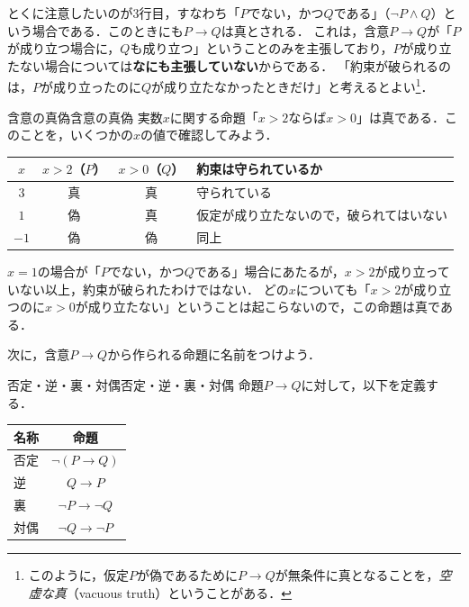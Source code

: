 とくに注意したいのが3行目，すなわち「$P$でない，かつ$Q$である」（$\lnot P \land Q$）という場合である．このときにも$P \to Q$は真とされる．
これは，含意$P \to Q$が「$P$が成り立つ場合に，$Q$も成り立つ」ということのみを主張しており，$P$が成り立たない場合については\textbf{なにも主張していない}からである．
「約束が破られるのは，$P$が成り立ったのに$Q$が成り立たなかったときだけ」と考えるとよい\footnote{このように，仮定$P$が偽であるために$P \to Q$が無条件に真となることを，\emph{空虚な真}（vacuous truth）ということがある．}．

\begin{example}{含意の真偽}{含意の真偽}
  実数$x$に関する命題「$x > 2$ならば$x > 0$」は真である．このことを，いくつかの$x$の値で確認してみよう．
  \begin{center}
    \begin{tabular}{|c|c|c|l|} \hline
      $x$  & $x > 2$（$P$） & $x > 0$（$Q$） & 約束は守られているか                     \\ \hline
      $3$  & 真             & 真             & 守られている                             \\ \hline
      $1$  & 偽             & 真             & 仮定が成り立たないので，破られてはいない \\ \hline
      $-1$ & 偽             & 偽             & 同上                                     \\ \hline
    \end{tabular}
  \end{center}
  $x = 1$の場合が「$P$でない，かつ$Q$である」場合にあたるが，$x > 2$が成り立っていない以上，約束が破られたわけではない．
  どの$x$についても「$x>2$が成り立つのに$x>0$が成り立たない」ということは起こらないので，この命題は真である．
\end{example}

次に，含意$P \to Q$から作られる命題に名前をつけよう．

\begin{definition}{否定・逆・裏・対偶}{否定・逆・裏・対偶}
  命題$P \to Q$に対して，以下を定義する．
  \begin{center}
    \begin{tabular}{|l|c|} \hline
      名称                      & 命題                  \\ \hline
      否定\index{ひてい@否定}   & $\lnot ( P \to Q )$   \\ \hline
      逆\index{ぎゃく@逆}       & $Q \to P$             \\ \hline
      裏\index{うら@裏}         & $\lnot P \to \lnot Q$ \\ \hline
      対偶\index{たいぐう@対偶} & $\lnot Q \to \lnot P$ \\ \hline
    \end{tabular}
  \end{center}
\end{definition}

